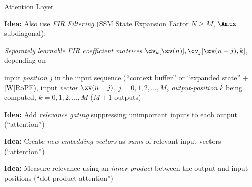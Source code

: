 \begin{slide}[\slideopts,toc={Attention}]{Attention Layer}

\vspace{-1em}

\textbf{Idea:} Also use \emph{FIR Filtering} (SSM State Expansion Factor $N\ge M$, $\Amtx$ subdiagonal):



\vspace{-1em}

\emph{Separately learnable FIR coefficient matrices} $\dv_k[\xv(n)], \cv_j[\xv(n-j),k]$, depending on
  \begin{enumerate}
    \mpitem input \emph{position} $j$ in the input sequence (``context buffer'' or ``expanded state'' + [W]RoPE),
    \mpitem input \emph{vector} $\xv(n-j)$,\; $j=0,1,2,\dots,M$,
    \mpitem \emph{output-position} $k$ being computed,\; $k=0,1,2,\dots,M$ ($M+1$ outputs)
  \end{enumerate}

\maybepause
\textbf{Idea:} Add \emph{relevance gating} suppressing unimportant inputs to each output (``attention'')

\vspace{0.2em}

\maybepause
\textbf{Idea:} Create \emph{new embedding vectors} as \emph{sums} of relevant input vectors (``attention'')

\vspace{0.2em}

\maybepause
\textbf{Idea:} Measure relevance using an \emph{inner product} between the output and input positions (``dot-product attention'')
\end{slide}

